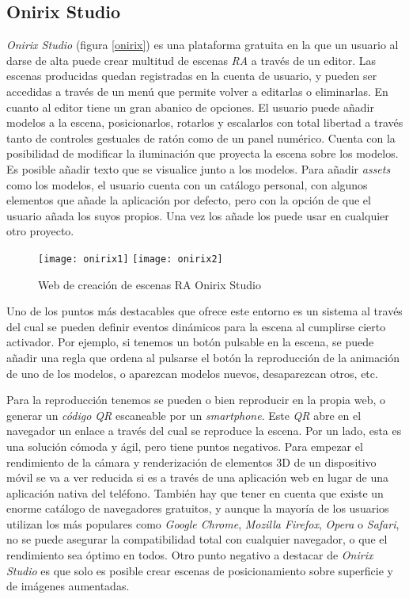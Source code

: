 \subsection{Onirix Studio}
\textit{Onirix Studio}\cite{onirix} (figura \ref{onirix}) es una plataforma gratuita en la que un usuario al darse de alta puede crear multitud de escenas \textit{RA} a través de un editor. Las escenas producidas quedan registradas en la cuenta de usuario, y pueden ser accedidas a través de un menú que permite volver a editarlas o eliminarlas. En cuanto al editor tiene un gran abanico de opciones. El usuario puede añadir modelos a la escena, posicionarlos, rotarlos y escalarlos con total libertad a través tanto de controles gestuales de ratón como de un panel numérico. Cuenta con la posibilidad de modificar la iluminación que proyecta la escena sobre los modelos. Es posible añadir texto que se visualice junto a los modelos. Para añadir \textit{assets} como los modelos, el usuario cuenta con un catálogo personal, con algunos elementos que añade la aplicación por defecto, pero con la opción de que el usuario añada los suyos propios. Una vez los añade los puede usar en cualquier otro proyecto.

\begin{figure}[h]
    \centering
    \texttt{[image: onirix1]}
    \texttt{[image: onirix2]}
    \caption[Aplicación Onirix Studio]{Web de creación de escenas RA Onirix Studio}
    \label{fig:onirix}
\end{figure}

Uno de los puntos más destacables que ofrece este entorno es un sistema al través del cual se pueden definir eventos dinámicos para la escena al cumplirse cierto activador. Por ejemplo, si tenemos un botón pulsable en la escena, se puede añadir una regla que ordena al pulsarse el botón la reproducción de la animación de uno de los modelos, o aparezcan modelos nuevos, desaparezcan otros, etc.

Para la reproducción tenemos se pueden o bien reproducir en la propia web, o generar un \textit{código QR} escaneable por un \textit{smartphone}. Este \textit{QR} abre en el navegador un enlace a través del cual se reproduce la escena. Por un lado, esta es una solución cómoda y ágil, pero tiene puntos negativos. Para empezar el rendimiento de la cámara y renderización de elementos 3D de un dispositivo móvil se va a ver reducida si es a través de una aplicación web en lugar de una aplicación nativa del teléfono. También hay que tener en cuenta que existe un enorme catálogo de navegadores gratuitos, y aunque la mayoría de los usuarios utilizan los más populares como \textit{Google Chrome}, \textit{Mozilla Firefox}, \textit{Opera} o \textit{Safari}, no se puede asegurar la compatibilidad total con cualquier navegador, o que el rendimiento sea óptimo en todos. Otro punto negativo a destacar de \textit{Onirix Studio}\cite{onirix} es que solo es posible crear escenas de posicionamiento sobre superficie y de imágenes aumentadas.

